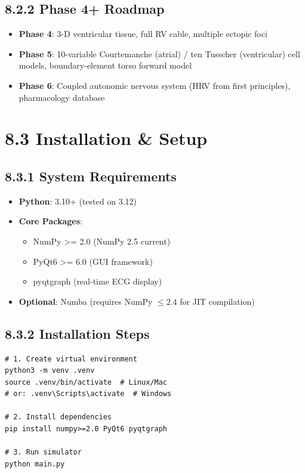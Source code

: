 \documentclass[12pt,oneside,a4paper]{book}
\begin{document}
\subsection{8.2.2 Phase 4+ Roadmap}

\begin{itemize}
  \item \textbf{Phase 4}: 3-D ventricular tissue, full RV cable, multiple ectopic foci
  \item \textbf{Phase 5}: 10-variable Courtemanche (atrial) / ten Tusscher (ventricular) cell models, boundary-element torso forward model
  \item \textbf{Phase 6}: Coupled autonomic nervous system (HRV from first principles), pharmacology database
\end{itemize}

\section{8.3 Installation \& Setup}

\subsection{8.3.1 System Requirements}

\begin{itemize}
  \item \textbf{Python}: 3.10+ (tested on 3.12)
  \item \textbf{Core Packages}:
    \begin{itemize}
      \item NumPy \textgreater= 2.0 (NumPy 2.5 current)
      \item PyQt6 \textgreater= 6.0 (GUI framework)
      \item pyqtgraph (real-time ECG display)
    \end{itemize}
  \item \textbf{Optional}: Numba (requires NumPy $\leq 2.4$ for JIT compilation)
\end{itemize}

\subsection{8.3.2 Installation Steps}

\begin{lstlisting}
# 1. Create virtual environment
python3 -m venv .venv
source .venv/bin/activate  # Linux/Mac
# or: .venv\Scripts\activate  # Windows

# 2. Install dependencies
pip install numpy>=2.0 PyQt6 pyqtgraph

# 3. Run simulator
python main.py
\end{lstlisting}
\end{document}

